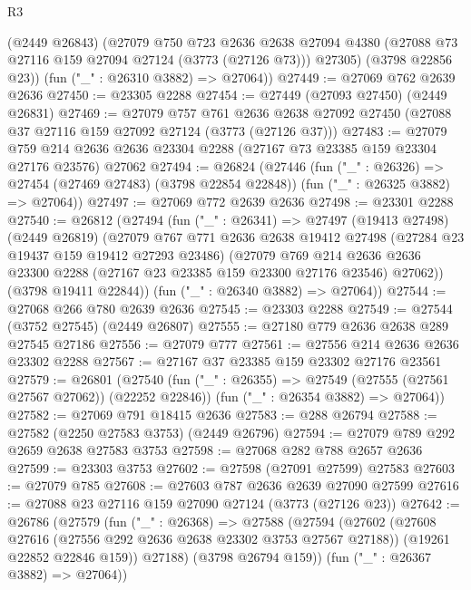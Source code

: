 \begin{lexlean}{R3}
\begin{coremodule}
        (@2449 @26843)
        (@27079
          @750
          @723
          @2636
          @2638
          @27094
          @4380
          (@27088 @73 @27116 @159 @27094 @27124 (@3773 (@27126 @73)))
          @27305)
        (@3798 @22856 @23))
      (fun ("_" : @26310 @3882) => @27064))
@27449 := @27069 @762 @2639 @2636
@27450 := @23305 @2288
@27454 := @27449 (@27093 @27450) (@2449 @26831)
@27469 := @27079
    @757
    @761
    @2636
    @2638
    @27092
    @27450
    (@27088 @37 @27116 @159 @27092 @27124 (@3773 (@27126 @37)))
@27483 := @27079
    @759
    @214
    @2636
    @2636
    @23304
    @2288
    (@27167 @73 @23385 @159 @23304 @27176 @23576)
    @27062
@27494 := @26824
    (@27446
      (fun ("_" : @26326) => @27454 (@27469 @27483) (@3798 @22854 @22848))
      (fun ("_" : @26325 @3882) => @27064))
@27497 := @27069 @772 @2639 @2636
@27498 := @23301 @2288
@27540 := @26812
    (@27494
      (fun ("_" : @26341) =>
      @27497
        (@19413 @27498)
        (@2449 @26819)
        (@27079
          @767
          @771
          @2636
          @2638
          @19412
          @27498
          (@27284 @23 @19437 @159 @19412 @27293 @23486)
          (@27079
            @769
            @214
            @2636
            @2636
            @23300
            @2288
            (@27167 @23 @23385 @159 @23300 @27176 @23546)
            @27062))
        (@3798 @19411 @22844))
      (fun ("_" : @26340 @3882) => @27064))
@27544 := @27068 @266 @780 @2639 @2636
@27545 := @23303 @2288
@27549 := @27544 (@3752 @27545) (@2449 @26807)
@27555 := @27180 @779 @2636 @2638 @289 @27545 @27186
@27556 := @27079 @777
@27561 := @27556 @214 @2636 @2636 @23302 @2288
@27567 := @27167 @37 @23385 @159 @23302 @27176 @23561
@27579 := @26801
    (@27540
      (fun ("_" : @26355) => @27549 (@27555 (@27561 @27567 @27062)) (@22252 @22846))
      (fun ("_" : @26354 @3882) => @27064))
@27582 := @27069 @791 @18415 @2636
@27583 := @288 @26794
@27588 := @27582 (@2250 @27583 @3753) (@2449 @26796)
@27594 := @27079 @789 @292 @2659 @2638 @27583 @3753
@27598 := @27068 @282 @788 @2657 @2636
@27599 := @23303 @3753
@27602 := @27598 (@27091 @27599) @27583
@27603 := @27079 @785
@27608 := @27603 @787 @2636 @2639 @27090 @27599
@27616 := @27088 @23 @27116 @159 @27090 @27124 (@3773 (@27126 @23))
@27642 := @26786
    (@27579
      (fun ("_" : @26368) =>
      @27588
        (@27594
          (@27602
            (@27608 @27616 (@27556 @292 @2636 @2638 @23302 @3753 @27567 @27188))
            (@19261 @22852 @22846 @159))
          @27188)
        (@3798 @26794 @159))
      (fun ("_" : @26367 @3882) => @27064))

\end{coremodule}
\end{lexlean}
